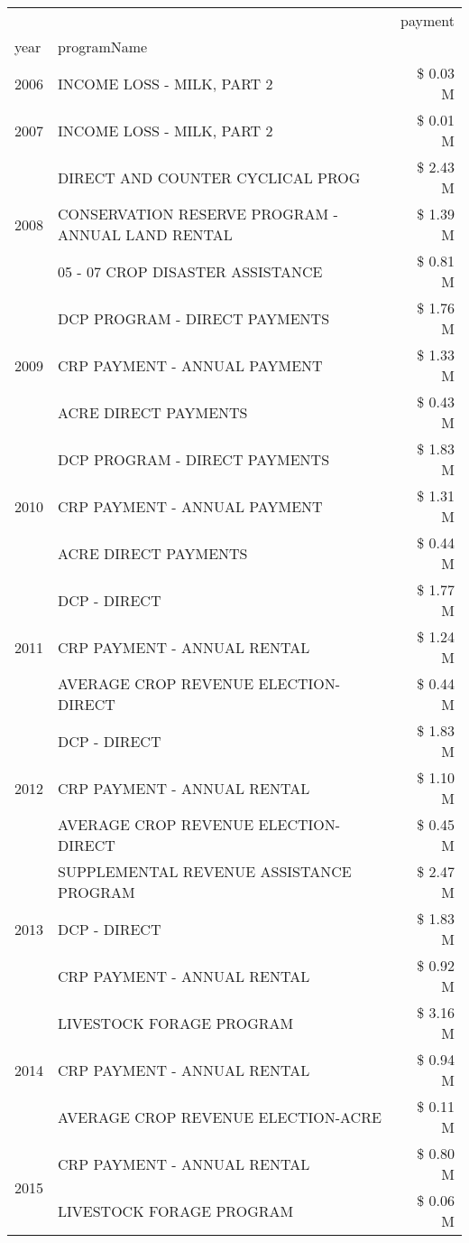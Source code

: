 \begin{tabular}{llr}
\toprule
 &  & payment \\
year & programName &  \\
\midrule
2006 & INCOME LOSS - MILK, PART 2 & \$ 0.03 M \\
\cline{1-3}
2007 & INCOME LOSS - MILK, PART 2 & \$ 0.01 M \\
\cline{1-3}
\multirow[t]{3}{*}{2008} & DIRECT AND COUNTER CYCLICAL PROG & \$ 2.43 M \\
 & CONSERVATION RESERVE PROGRAM - ANNUAL LAND RENTAL & \$ 1.39 M \\
 & 05 - 07 CROP DISASTER ASSISTANCE & \$ 0.81 M \\
\cline{1-3}
\multirow[t]{3}{*}{2009} & DCP PROGRAM - DIRECT PAYMENTS & \$ 1.76 M \\
 & CRP PAYMENT - ANNUAL PAYMENT & \$ 1.33 M \\
 & ACRE DIRECT PAYMENTS & \$ 0.43 M \\
\cline{1-3}
\multirow[t]{3}{*}{2010} & DCP PROGRAM - DIRECT PAYMENTS & \$ 1.83 M \\
 & CRP PAYMENT - ANNUAL PAYMENT & \$ 1.31 M \\
 & ACRE DIRECT PAYMENTS & \$ 0.44 M \\
\cline{1-3}
\multirow[t]{3}{*}{2011} & DCP - DIRECT & \$ 1.77 M \\
 & CRP PAYMENT - ANNUAL RENTAL & \$ 1.24 M \\
 & AVERAGE CROP REVENUE ELECTION-DIRECT & \$ 0.44 M \\
\cline{1-3}
\multirow[t]{3}{*}{2012} & DCP - DIRECT & \$ 1.83 M \\
 & CRP PAYMENT - ANNUAL RENTAL & \$ 1.10 M \\
 & AVERAGE CROP REVENUE ELECTION-DIRECT & \$ 0.45 M \\
\cline{1-3}
\multirow[t]{3}{*}{2013} & SUPPLEMENTAL REVENUE ASSISTANCE PROGRAM & \$ 2.47 M \\
 & DCP - DIRECT & \$ 1.83 M \\
 & CRP PAYMENT - ANNUAL RENTAL & \$ 0.92 M \\
\cline{1-3}
\multirow[t]{3}{*}{2014} & LIVESTOCK FORAGE PROGRAM & \$ 3.16 M \\
 & CRP PAYMENT - ANNUAL RENTAL & \$ 0.94 M \\
 & AVERAGE CROP REVENUE ELECTION-ACRE & \$ 0.11 M \\
\cline{1-3}
\multirow[t]{3}{*}{2015} & CRP PAYMENT - ANNUAL RENTAL & \$ 0.80 M \\
 & LIVESTOCK FORAGE PROGRAM & \$ 0.06 M \\

\end{tabular}
